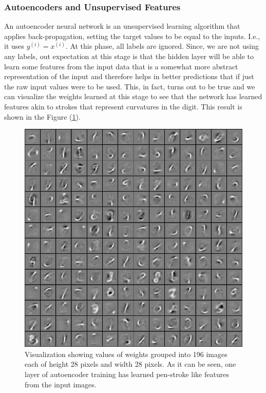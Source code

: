 \documentclass[10pt,twocolumn,letterpaper]{article}
\begin{document}
\subsubsection{Autoencoders and Unsupervised Features}
An autoencoder neural network is an unsupervised learning algorithm that applies back-propagation, setting the target values to be equal to the inputs. I.e., it uses $y^{(i)} = x^{(i)}$. At this phase, all labels are ignored. Since, we are not using any labels, out expectation at this stage is that the hidden layer will be able to learn some features from the input data that is a somewhat more abstract representation of the input and therefore helps in better predictions that if just the raw input values were to be used. This, in fact, turns out to be true and we can visualize the weights learned at this stage to see that the network has learned features akin to strokes that represent curvatures in the digit. This result is shown in the Figure (\ref{fig:weights}).
\begin{figure}[t]
\begin{center}
   \includegraphics[width=1\linewidth]{../images/weights.jpg}
\end{center}
   \caption{Visualization showing values of weights grouped into 196 images each of height 28 pixels and width 28 pixels. As it can be seen, one layer of autoencoder training has learned pen-stroke like features from the input images.}
   \label{fig:weights}
\end{figure}
\end{document}

